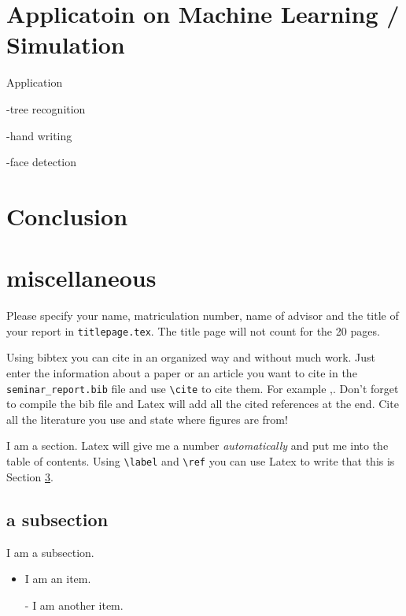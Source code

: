 \documentclass[twoside,a4paper,article]{combine}
\begin{document}
	
\section{Applicatoin on Machine Learning / Simulation}
	
	\cite{Adachi2015}
	\cite{Benedetti2016}
	\cite{Boyda2017}
	\cite{OMalley2017}
	\cite{Potok2017}
	
	
	Application
	 
	-tree recognition
	
	-hand writing
	
	-face detection
	


\section{Conclusion}
\section{miscellaneous}


\label{section}

Please specify your name, matriculation number, name of advisor and the title of your report in \linebreak
\verb+titlepage.tex+.
The title page will not count for the 20 pages.

Using bibtex you can cite in an organized way and without much work.
Just enter the information about a paper or an article you want to cite in the \verb+seminar_report.bib+ file and use \verb+\cite+ to cite them. For example \cite{Author08CVPR},\cite{Author04IJCV}.
Don't forget to compile the bib file and Latex will add all the cited references at the end.
Cite all the literature you use and state where figures are from!

I am a section. Latex will give me a number \emph{automatically} and put me into the table of contents.
Using \verb+\label+ and \verb+\ref+ you can use Latex to write that this is Section \ref{section}.



\subsection{a subsection}
I am a subsection.

\begin{itemize}
	\item I am an item.
	\item [-] I am another item.
\end{itemize}
\end{document}
